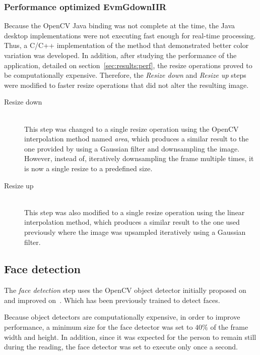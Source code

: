 \subsubsection{Performance optimized EvmGdownIIR} \label{sec:impl:evm:final}

Because the OpenCV Java binding was not complete at the time, the Java desktop
implementations were not executing fast enough for real-time processing. Thus,
a C/C++ implementation of the method that demonstrated better color variation
was developed. In addition, after studying the performance of the application,
detailed on section~\ref{sec:results:perf}, the resize operations proved to be
computationally expensive. Therefore, the \emph{Resize down} and
\emph{Resize up} steps were modified to faster resize operations that did not
alter the resulting image.

\begin{description}
  \item[Resize down]\hfill\\
        This step was changed to a single resize operation using the
        OpenCV interpolation method named \emph{area}, which produces a similar
        result to the one provided by using a Gaussian filter and downsampling
        the image. However, instead of, iteratively downsampling the frame
        multiple times, it is now a single resize to a predefined size.

  \item[Resize up]\hfill\\
        This step was also modified to a single resize operation using the
        linear interpolation method, which produces a similar result to the
        one used previously where the image was upsampled iteratively using
        a Gaussian filter.
\end{description}

\subsection{Face detection} \label{sec:impl:face}

The \emph{face detection} step uses the OpenCV object detector initially
proposed on~\cite{Viola2001Rapid} and improved on~\cite{Lienhart2002Extended}.
Which has been previously trained to detect faces.

Because object detectors are computationally expensive, in order to
improve performance, a minimum size for the face detector was set to $40\%$
of the frame width and height. In addition, since it was expected for the
person to remain still during the reading, the face detector was set to execute
only once a second.

